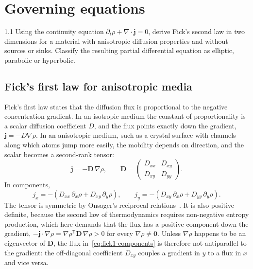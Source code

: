 \documentclass[11pt,a4paper]{article}
\numberwithin{equation}{section}
\theoremstyle{definition}
\theoremstyle{remark}
\newcommand{\grad}{\nabla}
\newcommand{\bj}{\bm{j}}
\newcommand{\bD}{\mathbf{D}}
\begin{document}
\section{Governing equations}\label{sec:pde}

\begin{task}{1.1}
  Using the continuity equation $\partial_t\rho + \grad\cdot\bj = 0$, derive Fick's second law
  in two dimensions for a material with anisotropic diffusion properties and without
  sources or sinks. Classify the resulting partial differential equation as elliptic,
  parabolic or hyperbolic.
\end{task}

\subsection{Fick's first law for anisotropic media}\label{sec:fick1}

Fick's first law states that the diffusion flux is proportional to the negative
concentration gradient. In an isotropic medium the constant of proportionality is a
scalar diffusion coefficient $D$, and the flux points exactly down the gradient,
$\bj = -D\grad\rho$. In an anisotropic medium, such as a crystal surface with channels
along which atoms jump more easily, the mobility depends on direction, and the scalar
becomes a second-rank tensor:
\begin{equation}\label{eq:fick1}
  \bj = -\bD\,\grad\rho,
  \qquad
  \bD =
  \begin{pmatrix}
    D_{xx} & D_{xy} \\
    D_{xy} & D_{yy}
  \end{pmatrix}.
\end{equation}
In components,
\begin{equation}\label{eq:fick1-components}
  j_x = -\left(D_{xx}\,\partial_x\rho + D_{xy}\,\partial_y\rho\right),
  \qquad
  j_y = -\left(D_{xy}\,\partial_x\rho + D_{yy}\,\partial_y\rho\right).
\end{equation}
The tensor is symmetric by Onsager's reciprocal relations~\citep{onsager1931, nye1985}. It
is also positive definite, because the second law of thermodynamics requires non-negative
entropy production, which here demands that the flux has a positive component down the
gradient, $-\bj\cdot\grad\rho = \grad\rho^{\mathsf{T}}\bD\,\grad\rho > 0$ for every
$\grad\rho \neq \bm{0}$. Unless $\grad\rho$ happens to be an eigenvector of $\bD$, the flux
in~\eqref{eq:fick1-components} is therefore not antiparallel to the gradient: the off-diagonal
coefficient $D_{xy}$ couples a gradient in $y$ to a flux in $x$ and vice versa.
\end{document}
